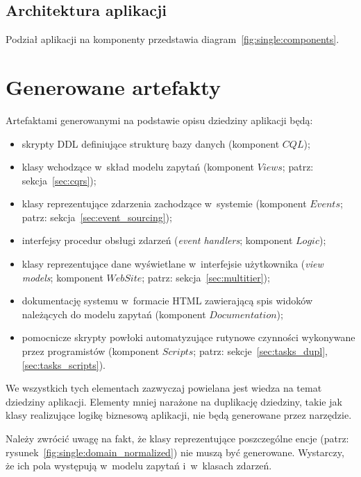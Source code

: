 \subsection{Architektura aplikacji}

Podział aplikacji na komponenty przedstawia diagram~\ref{fig:single:components}.




\section{Generowane artefakty} \label{sec:generated_artifacts}

Artefaktami generowanymi na podstawie opisu dziedziny aplikacji będą:

\begin{itemize}
 \item skrypty DDL definiujące strukturę bazy danych (komponent $CQL$);
 \item klasy wchodzące w~skład modelu zapytań (komponent $Views$; patrz: sekcja~\ref{sec:cqrs});
 \item klasy reprezentujące zdarzenia zachodzące w~systemie (komponent $Events$; patrz: sekcja~\ref{sec:event_sourcing});
 \item interfejsy procedur obsługi zdarzeń (\emph{event handlers}; komponent $Logic$);
 \item klasy reprezentujące dane wyświetlane w~interfejsie użytkownika (\emph{view models}; komponent $WebSite$; patrz: sekcja~\ref{sec:multitier});
 \item dokumentację systemu w~formacie HTML zawierającą spis widoków należących do modelu zapytań (komponent $Documentation$);
 \item pomocnicze skrypty powłoki automatyzujące rutynowe czynności wykonywane przez programistów (komponent $Scripts$; patrz: sekcje~\ref{sec:tasks_dupl}, \ref{sec:tasks_scripts}).
\end{itemize}

We wszystkich tych elementach zazwyczaj powielana jest wiedza na temat dziedziny aplikacji.
Elementy mniej narażone na duplikację dziedziny, takie jak klasy realizujące logikę biznesową aplikacji, nie będą generowane przez narzędzie.

Należy zwrócić uwagę na fakt, że klasy reprezentujące poszczególne encje (patrz: rysunek~\ref{fig:single:domain_normalized}) nie muszą być generowane.
Wystarczy, że ich pola występują w~modelu zapytań i~w~klasach zdarzeń.



